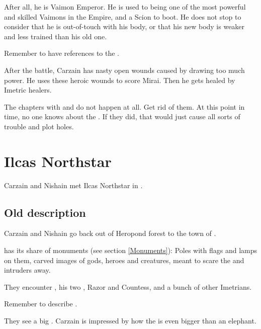 \begin{garbage}
After all, he is Vaimon Emperor. 
He is used to being one of the most powerful and skilled Vaimons in the Empire, and a Scion to boot. 
He does not stop to consider that he is out-of-touch with his body, or that his new body is weaker and less trained than his old one. 

Remember to have references to the \hs{\shechinah}. 

After the battle, Carzain has nasty open wounds caused by drawing too much \qliphah{} power. 
He uses these heroic wounds to score Mirai. 
Then he gets healed by Imetric healers. 

The chapters with \ChyrieEsmerel{} and \LocarPsyrex{} do not happen at all. 
Get rid of them. 
At this point in time, no one knows about the \vertex. 
If they did, that would just cause all sorts of trouble and plot holes. 















\section{Ilcas Northstar}
Carzain and Nishain met Ilcas Northstar in \Bryndwin. 









\subsection{Old description}
Carzain and Nishain go back out of Heropond forest to the town of \Bryndwin.

\Bryndwin{} has its share of monuments (see section \ref{Monuments}): Poles with flags and lamps on them, carved images of gods, heroes and creatures, meant to scare the \Wylde{} and intruders away.

They encounter , his two \nycans, Razor and Countess, and a bunch of other Imetrians. 

Remember to describe .

They see a big \hs{\mulgron}. Carzain is impressed by how the \mulgron{} is even bigger than an elephant. 


\end{garbage}
